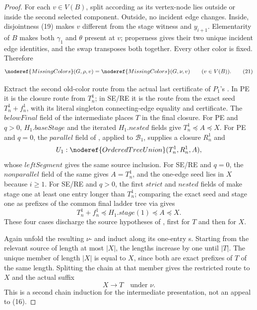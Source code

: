 \begin{proof}
For each \(v\in V(B)\), split according as its vertex-node lies outside
or inside the second selected component.  Outside, no incident edge
changes.  Inside, disjointness (19) makes \(v\) different from the stage
witness and \(y_{i+1}\).  Elementarity of \(B\) makes both
\(\gamma_1\) and \(\theta\) present at \(v\); properness gives their two
unique incident edge identities, and the swap transposes both together.
Every other color is fixed.  Therefore
\[
 \noderef{MissingColors}(G,\rho,v)=
 \noderef{MissingColors}(G,\nu,v)\qquad(v\in V(B)).            \tag{21}
\]

Extract the second old-color route from the actual last certificate of
\(P_1\)'s .  In PE it is the closure route from
\(T_n^1\); in SE/RE it is the route from the exact seed
\(T_n^1+f_n^1\), with its literal singleton connecting-edge equality and
 certificate.  The
\(\mathit{belowFinal}\) field of the intermediate
 places \(T\) in the final closure.
For PE and \(q>0\), \(H_1.\mathit{baseStage}\) and the iterated
\(H_1.\mathit{nested}\) fields give
\(T_n^1\preccurlyeq A\preccurlyeq X\).  For PE and \(q=0\),
the \(\mathit{parallel}\) field of , applied to
\(\mathcal B_1\), supplies a closure \(R_n^1\) and
\[
 U_1:\noderef{OrderedTreeUnion}(T_n^1,R_n^1,A),
\]
whose \(\mathit{leftSegment}\) gives the same source inclusion.  For
SE/RE and \(q=0\), the \(\mathit{nonparallel}\) field of the same
 gives
\(A=T_n^1\), and the one-edge seed lies in \(X\) because \(i\ge1\).
For SE/RE and \(q>0\), the first \(\mathit{strict}\) and
\(\mathit{nested}\) fields of  make stage
one at least one entry longer than \(T_n^1\); comparing the exact seed
and stage one as prefixes of the common final ladder tree via
 gives
\[
 T_n^1+f_n^1\preccurlyeq H_1.\mathit{stage}(1)
                    \preccurlyeq A\preccurlyeq X.             \tag{22}
\]
These four cases discharge the source hypotheses of
, first for \(T\) and then
for \(X\).

Again unfold the resulting
\(\nu\)- and induct along its
one-entry s.  Starting from the relevant
source of length at most \(|X|\), the lengths increase by one until
\(|T|\).  The unique member of length \(|X|\) is equal to \(X\), since
both are exact prefixes of \(T\) of the same length.  Splitting the chain
at that member gives the restricted route to \(X\) and the actual suffix
\[
                              X\longrightarrow T
                     \quad\text{under }\nu.                  \tag{23}
\]
This is a second chain induction for the intermediate presentation, not
an appeal to (16).


\end{proof}
